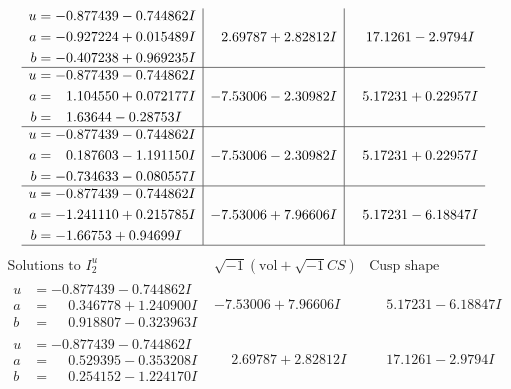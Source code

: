 \documentclass[1p]{elsarticle_modified}
\theoremstyle{definition}
\newcommand{\I}{\sqrt{-1}}
\begin{document}
$$\begin{array}{c|c|c}
\begin{aligned}
u &= -0.877439 - 0.744862 I \\
a &= -0.927224 + 0.015489 I \\
b &= -0.407238 + 0.969235 I\end{aligned}
 & \phantom{-}2.69787 + 2.82812 I & \phantom{-}17.1261 - 2.9794 I \\ \hline\begin{aligned}
u &= -0.877439 - 0.744862 I \\
a &= \phantom{-}1.104550 + 0.072177 I \\
b &= \phantom{-}1.63644 - 0.28753 I\end{aligned}
 & -7.53006 - 2.30982 I & \phantom{-}5.17231 + 0.22957 I \\ \hline\begin{aligned}
u &= -0.877439 - 0.744862 I \\
a &= \phantom{-}0.187603 - 1.191150 I \\
b &= -0.734633 - 0.080557 I\end{aligned}
 & -7.53006 - 2.30982 I & \phantom{-}5.17231 + 0.22957 I \\ \hline\begin{aligned}
u &= -0.877439 - 0.744862 I \\
a &= -1.241110 + 0.215785 I \\
b &= -1.66753 + 0.94699 I\end{aligned}
 & -7.53006 + 7.96606 I & \phantom{-}5.17231 - 6.18847 I\\
 \hline 
 \end{array}$$\newpage$$\begin{array}{c|c|c}  
\text{Solutions to }I^u_{2}& \I (\text{vol} + \sqrt{-1}CS) & \text{Cusp shape}\\
 \hline 
\begin{aligned}
u &= -0.877439 - 0.744862 I \\
a &= \phantom{-}0.346778 + 1.240900 I \\
b &= \phantom{-}0.918807 - 0.323963 I\end{aligned}
 & -7.53006 + 7.96606 I & \phantom{-}5.17231 - 6.18847 I \\ \hline\begin{aligned}
u &= -0.877439 - 0.744862 I \\
a &= \phantom{-}0.529395 - 0.353208 I \\
b &= \phantom{-}0.254152 - 1.224170 I\end{aligned}
 & \phantom{-}2.69787 + 2.82812 I & \phantom{-}17.1261 - 2.9794 I \\ \hline\begin{aligned}

\end{aligned}
\end{array}$$
\end{document}
